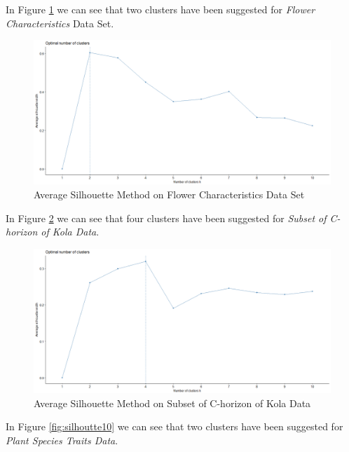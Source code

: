 \begin{itemize}
\vspace{15mm}

In Figure \ref{fig:silhoutte8} we can see that two clusters have been suggested for \textit{Flower Characteristics} Data Set.

\begin{figure}[h!]
  \centering
  \includegraphics[scale=1.3]{figures/results/flower/silhouette.png}
  \caption{Average Silhouette Method on Flower Characteristics Data Set}
  \label{fig:silhoutte8}
\end{figure}

\newpage

In Figure \ref{fig:silhoutte9} we can see that four clusters have been suggested for \textit{Subset of C-horizon of Kola Data}.

\begin{figure}[h!]
  \centering
  \includegraphics[scale=1.3]{figures/results/chorsub/silhouette.png}
  \caption{Average Silhouette Method on Subset of C-horizon of Kola Data}
  \label{fig:silhoutte9}
\end{figure}

\vspace{15mm}

In Figure \ref{fig:silhoutte10} we can see that two clusters have been suggested for \textit{Plant Species Traits Data}.


\end{itemize}
